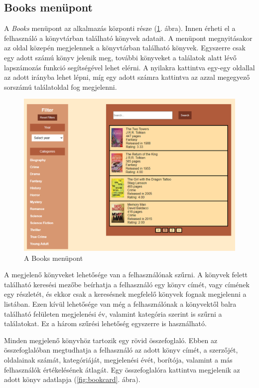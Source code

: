 \subsection{Books menüpont}

A \textit{Books} menüpont az alkalmazás központi része (\ref{fig:books}. ábra). Innen érheti el a felhasználó a könyvtárban található könyvek adatait. A menüpont megnyitásakor az oldal közepén megjelennek a könyvtárban található könyvek. Egyszerre csak egy adott számú könyv jelenik meg, további könyveket a találatok alatt lévő lapszámozás funkció segítségével lehet elérni. A nyilakra kattintva egy-egy oldallal az adott irányba lehet lépni, míg egy adott számra kattintva az azzal megegyező sorszámú találatoldal fog megjelenni.

\begin{figure}[h]
\centering
\includegraphics[scale=0.5]{images/application/books.png}
\caption{A Books menüpont}
\label{fig:books}
\end{figure}

A megjelenő könyveket lehetősége van a felhasználónak szűrni. A könyvek felett található keresési mezőbe beírhatja a felhasználó egy könyv címét, vagy címének egy részletét, és ekkor csak a keresésnek megfelelő könyvek fognak megjelenni a listában. Ezen kívül lehetősége van még a felhasználónak a könyvektől balra található felületen megjelenési év, valamint kategória szerint is szűrni a találatokat. Ez a három szűrési lehetőség egyszerre is használható.

Minden megjelenő könyvhöz tartozik egy rövid összefoglaló. Ebben az összefoglalóban megtudhatja a felhasználó az adott könyv címét, a szerzőjét, oldalainak számát, kategóriáját, megjelenési évét, borítója, valamint a más felhasználók értékelésének átlagát. Egy összefoglalóra kattintva megjelenik az adott könyv adatlapja (\ref{fig:bookcard}. ábra).

